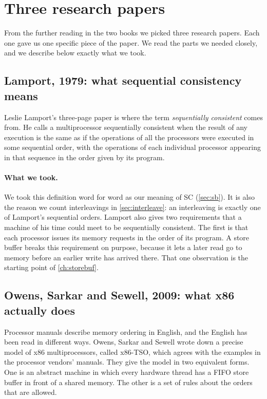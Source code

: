 \section{Three research papers}
\label{sec:papers}

From the further reading in the two books we picked three research papers. Each one gave us one specific piece of the paper. We read the parts we needed closely, and we describe below exactly what we took.

\subsection{Lamport, 1979: what sequential consistency means}
\label{sec:lamport}

Leslie Lamport's three-page paper\cite{lamport1979} is where the term \emph{sequentially consistent} comes from. He calls a multiprocessor sequentially consistent when the result of any execution is the same as if the operations of all the processors were executed in some sequential order, with the operations of each individual processor appearing in that sequence in the order given by its program.

\paragraph{What we took.} We took this definition word for word as our meaning of SC (\cref{sec:sb}). It is also the reason we count interleavings in \cref{sec:interleave}: an interleaving is exactly one of Lamport's sequential orders. Lamport also gives two requirements that a machine of his time could meet to be sequentially consistent. The first is that each processor issues its memory requests in the order of its program. A store buffer breaks this requirement on purpose, because it lets a later read go to memory before an earlier write has arrived there. That one observation is the starting point of \cref{ch:storebuf}.

\subsection{Owens, Sarkar and Sewell, 2009: what x86 actually does}
\label{sec:owens}

Processor manuals describe memory ordering in English, and the English has been read in different ways. Owens, Sarkar and Sewell\cite{owens2009} wrote down a precise model of x86 multiprocessors, called x86-TSO, which agrees with the examples in the processor vendors' manuals. They give the model in two equivalent forms. One is an abstract machine in which every hardware thread has a FIFO store buffer in front of a shared memory. The other is a set of rules about the orders that are allowed.

